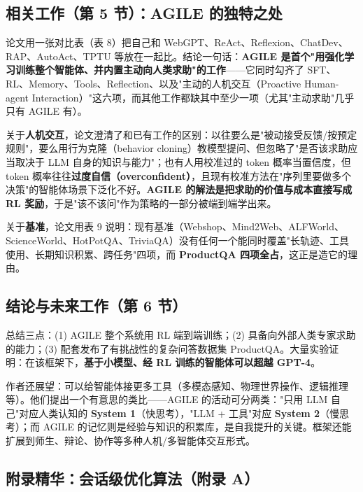 \documentclass[11pt,UTF8,fontset=fandol]{ctexart}
\begin{document}
\subsection{相关工作（第 5 节）：AGILE 的独特之处}

论文用一张对比表（表 8）把自己和 WebGPT、ReAct、Reflexion、ChatDev、RAP、AutoAct、TPTU 等放在一起比。结论一句话：\textbf{AGILE 是首个"用强化学习训练整个智能体、并内置主动向人类求助"的工作}——它同时勾齐了 SFT、RL、Memory、Tools、Reflection、以及"主动的人机交互（Proactive Human-agent Interaction）"这六项，而其他工作都缺其中至少一项（尤其"主动求助"几乎只有 AGILE 有）。

关于\textbf{人机交互}，论文澄清了和已有工作的区别：以往要么是"被动接受反馈/按预定规则"，要么用行为克隆（behavior cloning）教模型提问、但忽略了"是否该求助应当取决于 LLM 自身的知识与能力"；也有人用校准过的 token 概率当置信度，但 token 概率往往\textbf{过度自信（overconfident）}，且现有校准方法在"序列里要做多个决策"的智能体场景下泛化不好。\textbf{AGILE 的解法是把求助的价值与成本直接写成 RL 奖励}，于是"该不该问"作为策略的一部分被端到端学出来。

关于\textbf{基准}，论文用表 9 说明：现有基准（Webshop、Mind2Web、ALFWorld、ScienceWorld、HotPotQA、TriviaQA）没有任何一个能同时覆盖"长轨迹、工具使用、长期知识积累、跨任务"四项，而 \textbf{ProductQA 四项全占}，这正是造它的理由。

\subsection{结论与未来工作（第 6 节）}

总结三点：(1) AGILE 整个系统用 RL 端到端训练；(2) 具备向外部人类专家求助的能力；(3) 配套发布了有挑战性的复杂问答数据集 ProductQA。大量实验证明：在该框架下，\textbf{基于小模型、经 RL 训练的智能体可以超越 GPT-4}。

作者还展望：可以给智能体接更多工具（多模态感知、物理世界操作、逻辑推理等）。他们提出一个有意思的类比——AGILE 的活动可分两类："只用 LLM 自己"对应人类认知的 \textbf{System 1}（快思考），"LLM + 工具"对应 \textbf{System 2}（慢思考）；而 AGILE 的记忆则是经验与知识的积累库，是自我提升的关键。框架还能扩展到师生、辩论、协作等多种人机/多智能体交互形式。

\subsection{附录精华：会话级优化算法（附录 A）}
\label{sec:appendixA}
\end{document}
